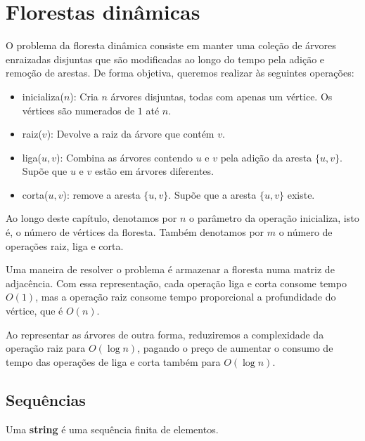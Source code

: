 \newcommand{\splits}{cortes }
\newcommand{\splitt}{corte }
\newcommand{\concatenations}{concatenações }
\newcommand{\concatenation}{concatenação }
\newcommand{\str}{string}
\newcommand{\Str}{String}

\chapter{Florestas dinâmicas}
\label{cap:florestas}

O problema da floresta dinâmica consiste em manter uma coleção de árvores enraizadas disjuntas que são modificadas ao longo do tempo pela adição e remoção de arestas. De forma objetiva, queremos realizar às seguintes operações:

\begin{itemize}
    \item inicializa($n$): Cria $n$ árvores disjuntas, todas com apenas um vértice. Os vértices são numerados de $1$ até $n$.
    \item raiz($v$): Devolve a raiz da árvore que contém $v$.
    \item liga($u,v$): Combina as árvores contendo $u$ e $v$ pela adição da aresta $\{u,v\}$. Supõe que $u$ e $v$ estão em árvores diferentes.
    \item corta($u,v$): remove a aresta $\{u,v\}$. Supõe que a aresta $\{u,v\}$ existe.
\end{itemize}

Ao longo deste capítulo, denotamos por $n$ o parâmetro da operação inicializa, isto é, o número de vértices da floresta. Também denotamos por $m$ o número de operações raiz, liga e corta.

Uma maneira de resolver o problema é armazenar a floresta numa matriz de adjacência. Com essa representação, cada operação liga e corta consome tempo $O(1)$, mas a operação raiz consome tempo proporcional a profundidade do vértice, que é $O(n)$.

Ao representar as árvores de outra forma, reduziremos a complexidade da operação raiz para $O(\log n)$, pagando o preço de aumentar o consumo de tempo das operações de liga e corta também para $O(\log n)$.

\section{Sequências}
\label{sec:sequencia}
Uma \textbf{\str} é uma sequência finita de elementos. 

